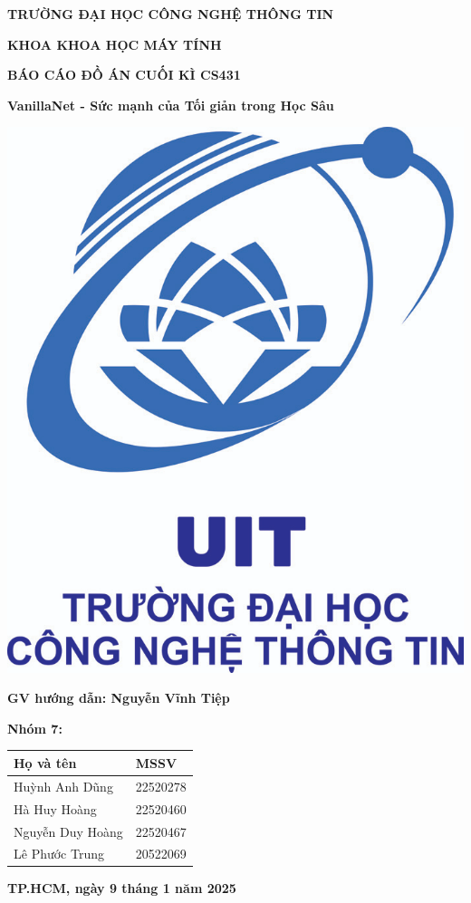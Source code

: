 \documentclass[a4paper,12pt]{article}
\begin{document}
\begin{titlepage}

\begin{center}

\textbf{TRƯỜNG ĐẠI HỌC CÔNG NGHỆ THÔNG TIN}

\textbf{KHOA KHOA HỌC MÁY TÍNH}

\vspace{1cm}

\textbf{BÁO CÁO ĐỒ ÁN CUỐI KÌ CS431}

\vspace{1cm}

\textbf{VanillaNet - Sức mạnh của Tối giản trong Học Sâu}

\vspace{1cm}
\includegraphics[width=5 cm]{logo.png}
\vspace{1cm}

\textbf{GV hướng dẫn: Nguyễn Vĩnh Tiệp}

\vspace{1cm}

\textbf{Nhóm 7:}

\vspace{0.5cm}

\begin{tabular}{p{5cm}p{5cm}}
\hline
\textbf{Họ và tên} & \textbf{MSSV} \\
\hline
Huỳnh Anh Dũng & 22520278\\
\hline
Hà Huy Hoàng & 22520460 \\
\hline
Nguyễn Duy Hoàng & 22520467\\
\hline
Lê Phước Trung & 20522069 \\
\hline
\end{tabular}

\vspace{1cm}

\textbf{TP.HCM, ngày 9 tháng 1 năm 2025}

\newpage
\tableofcontents
\end{center}

\end{titlepage}
\end{document}
